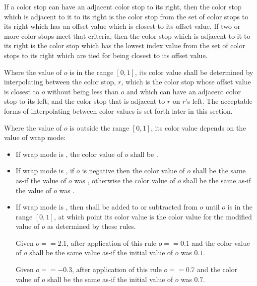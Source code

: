 \begin{enumeratea}
\item If a color stop can have an adjacent color stop to its right, then the color stop which is adjacent to it to its right is the color stop from the set of color stops to its right which has an offset value which is closest to its offset value. If two or more color stops meet that criteria, then the color stop which is adjacent to it to its right is the color stop which has the lowest index value from the set of color stops to its right which are tied for being closest to its offset value.

\item Where the value of $o$ is in the range $[0,1]$, its color value shall be determined by interpolating between the color stop, $r$, which is the color stop whose offset value is closest to $o$ without being less than $o$ and which can have an adjacent color stop to its left, and the color stop that is adjacent to $r$ on $r$'s left. The acceptable forms of interpolating between color values is set forth later in this section.

\item Where the value of $o$ is outside the range $[0,1]$, its color value depends on the value of wrap mode:
	\begin{itemize}
	\item If wrap mode is , the color value of $o$ shall be .
	
	\item If wrap mode is , if $o$ is negative then the color value of $o$ shall be the same as-if the value of $o$ was , otherwise the color value of $o$ shall be the same as-if the value of $o$ was .
	
	\item If wrap mode is , then  shall be added to or subtracted from $o$ until $o$ is in the range $[0,1]$, at which point its color value is the color value for the modified value of $o$ as determined by these rules.
	\begin{example}
	Given $o == 2.1$, after application of this rule $o == 0.1$ and the color value of $o$ shall be the same value as-if the initial value of $o$ was $0.1$.
	
	Given $o == -0.3$, after application of this rule $o == 0.7$ and the color value of $o$ shall be the same as-if the initial value of $o$ was $0.7$.
	\end{example}
	

\end{itemize}
\end{enumeratea}
